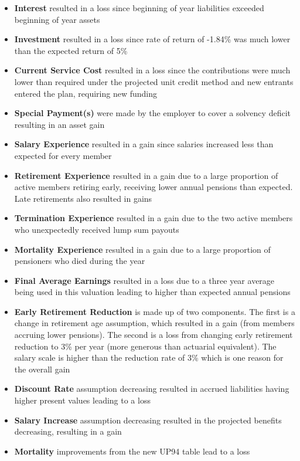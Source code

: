 \documentclass{report}
\begin{document}
\begin{itemize}
\item \textbf{Interest} resulted in a loss since beginning of year liabilities exceeded beginning of year assets
\item \textbf{Investment} resulted in a loss since rate of return of -1.84\% was much lower than the expected return of 5\% 
\item \textbf{Current Service Cost} resulted in a loss since the contributions were much lower than required under the projected unit credit method and new entrants entered the plan, requiring new funding
\item \textbf{Special Payment(s)} were made by the employer to cover a solvency deficit resulting in an asset gain
\item \textbf{Salary Experience} resulted in a gain since salaries increased less than expected for every member 
\item \textbf{Retirement Experience} resulted in a gain due to a large proportion of active members retiring early, receiving lower annual pensions than expected. Late retirements also resulted in gains
\item \textbf{Termination Experience} resulted in a gain due to the two active members who unexpectedly received lump sum payouts
\item \textbf{Mortality Experience} resulted in a gain due to a large proportion of pensioners who died during the year
\item \textbf{Final Average  Earnings} resulted in a loss due to a three year average being used in this valuation leading to higher than expected annual pensions
\item \textbf{Early Retirement Reduction} is made up of two components. The first is a change in retirement age assumption, which resulted in a gain (from members accruing lower pensions). The second is a loss from changing early retirement reduction to 3\% per year (more generous than actuarial equivalent). The salary scale is higher than the reduction rate of 3\% which is one reason for the overall gain
\item \textbf{Discount Rate} assumption decreasing resulted in accrued liabilities having higher present values leading to a loss
\item \textbf{Salary Increase} assumption decreasing resulted in the projected benefits decreasing, resulting in a gain
\item \textbf{Mortality} improvements from the new UP94 table lead to a loss
\end{itemize}
\end{document}
